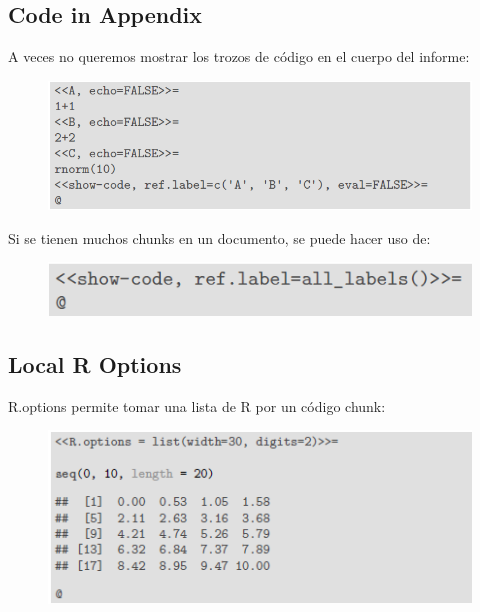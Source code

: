\documentclass[10pt]{article}   			%
\begin{document}
\newpage
\subsection{Code in Appendix}

A veces no queremos mostrar los trozos de código en el cuerpo del informe:
		
\begin{figure}[ht] 
	\centering
		\includegraphics[scale=0.7]{Appendix1}
		\label{fig:Appendix1}
\end{figure}

Si se tienen muchos chunks en un documento, se puede hacer uso de:

\begin{figure}[ht] 
	\centering
		\includegraphics[scale=1]{Appendix2} 
		\label{fig:Appendix2}
\end{figure}

\subsection{Local R Options}

R.options permite tomar una lista de R por un código chunk:
		
\begin{figure}[ht] 
	\centering
		\includegraphics[scale=1.1]{Options1}
		\label{fig:Appendix1}
\end{figure}
\end{document}
